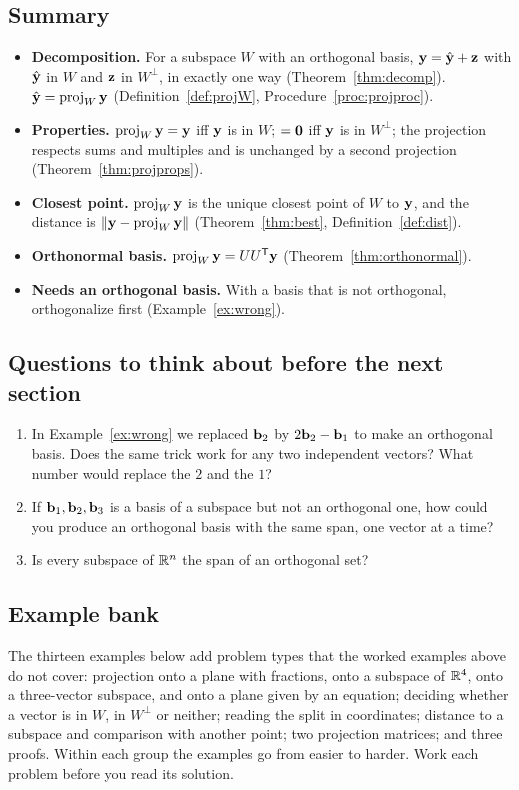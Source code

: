 \documentclass[11pt]{article}
\begin{document}
\subsection*{Summary}
\begin{itemize}
  \item \textbf{Decomposition.} For a subspace $W$ with an orthogonal basis, $\mathbf{y}=\hat{\mathbf{y}}+\mathbf{z}$ with $\hat{\mathbf{y}}$ in $W$ and $\mathbf{z}$ in $W^{\perp}$, in exactly one way (Theorem~\ref{thm:decomp}). $\hat{\mathbf{y}}=\operatorname{proj}_W\mathbf{y}$ (Definition~\ref{def:projW}, Procedure~\ref{proc:projproc}).
  \item \textbf{Properties.} $\operatorname{proj}_W\mathbf{y}=\mathbf{y}$ iff $\mathbf{y}$ is in $W$; $=\mathbf{0}$ iff $\mathbf{y}$ is in $W^{\perp}$; the projection respects sums and multiples and is unchanged by a second projection (Theorem~\ref{thm:projprops}).
  \item \textbf{Closest point.} $\operatorname{proj}_W\mathbf{y}$ is the unique closest point of $W$ to $\mathbf{y}$, and the distance is $\lVert\mathbf{y}-\operatorname{proj}_W\mathbf{y}\rVert$ (Theorem~\ref{thm:best}, Definition~\ref{def:dist}).
  \item \textbf{Orthonormal basis.} $\operatorname{proj}_W\mathbf{y}=UU^{\mathsf T}\mathbf{y}$ (Theorem~\ref{thm:orthonormal}).
  \item \textbf{Needs an orthogonal basis.} With a basis that is not orthogonal, orthogonalize first (Example~\ref{ex:wrong}).
\end{itemize}

\subsection*{Questions to think about before the next section}
\begin{enumerate}[nosep]
  \item In Example~\ref{ex:wrong} we replaced $\mathbf{b}_2$ by $2\mathbf{b}_2-\mathbf{b}_1$ to make an orthogonal basis. Does the same trick work for any two independent vectors? What number would replace the $2$ and the $1$?
  \item If $\mathbf{b}_1,\mathbf{b}_2,\mathbf{b}_3$ is a basis of a subspace but not an orthogonal one, how could you produce an orthogonal basis with the same span, one vector at a time?
  \item Is every subspace of $\mathbb{R}^n$ the span of an orthogonal set?
\end{enumerate}

\subsection*{Example bank}
The thirteen examples below add problem types that the worked examples above do not cover: projection onto a plane with fractions, onto a subspace of $\mathbb{R}^4$, onto a three-vector subspace, and onto a plane given by an equation; deciding whether a vector is in $W$, in $W^{\perp}$ or neither; reading the split in coordinates; distance to a subspace and comparison with another point; two projection matrices; and three proofs. Within each group the examples go from easier to harder. Work each problem before you read its solution.
\end{document}
